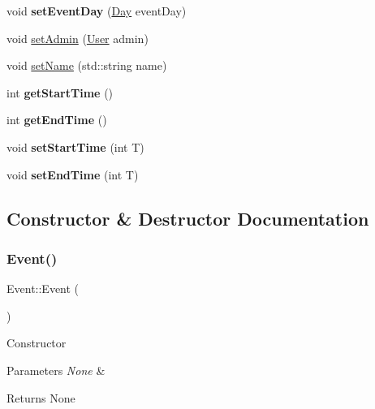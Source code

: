 \begin{DoxyCompactItemize}
void {\bfseries set\+Event\+Day} (\mbox{\hyperlink{class_day}{Day}} event\+Day)
\item 
void \mbox{\hyperlink{class_event_ae64a2062b6e4f673d81efbc6bc98c210}{set\+Admin}} (\mbox{\hyperlink{class_user}{User}} admin)
\item 
void \mbox{\hyperlink{class_event_a25fc700fb24ac3f0560732a183b9782c}{set\+Name}} (std\+::string name)
\item 
\mbox{\label{class_event_a3283554ea0739c5c1916269f1a498bb7}} 
int {\bfseries get\+Start\+Time} ()
\item 
\mbox{\label{class_event_a15cc6c49faa82aea991deec2f6230c64}} 
int {\bfseries get\+End\+Time} ()
\item 
\mbox{\label{class_event_a302828084520c9b6c041cf79ef743b4f}} 
void {\bfseries set\+Start\+Time} (int T)
\item 
\mbox{\label{class_event_a3934cd101a64b445e52c90f7847a166d}} 
void {\bfseries set\+End\+Time} (int T)
\end{DoxyCompactItemize}


\subsection{Constructor \& Destructor Documentation}
\mbox{\label{class_event_a5a40dd4708297f7031e29b39e039ae10}} 
\subsubsection{\texorpdfstring{Event()}{Event()}\hspace{0.1cm}{\footnotesize\ttfamily [1/2]}}
{\footnotesize\ttfamily Event\+::\+Event (\begin{DoxyParamCaption}{ }\end{DoxyParamCaption})}

Constructor 
\begin{DoxyParams}{Parameters}
{\em None} & \\
\hline
\end{DoxyParams}
\begin{DoxyReturn}{Returns}
None 
\end{DoxyReturn}
\mbox{\label{class_event_a7704ec01ce91e673885792054214b3d2}} 
